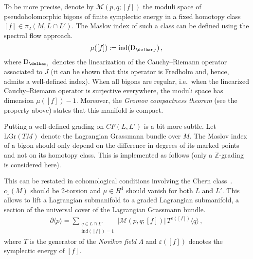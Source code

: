     To be more precise, denote by $\mathcal{M}(p,q;[f])$ the moduli space of pseudoholomorphic bigons of finite symplectic energy in a fixed homotopy class $[f]\in\pi_2(M,L\cap L')$. The Maslov index of such a class can be defined using the spectral flow approach.
    \begin{gather}
        \mu([f]) := \mathrm{ind}(\mathrm{D}_{\delbar_J})\,,
    \end{gather}
    where $\mathrm{D}_{\delbar_j}$ denotes the linearization of the Cauchy--Riemann operator associated to $J$ (it can be shown that this operator is Fredholm and, hence, admits a well-defined index). When all bigons are regular, i.e.~when the linearized Cauchy--Riemann operator is surjective everywhere, the moduli space has dimension $\mu([f])-1$. Moreover, the \textit{Gromov compactness theorem} (see the property above) states that this manifold is compact.

    Putting a well-defined grading on $CF(L,L')$ is a bit more subtle. Let $\mathrm{LGr}(TM)$ denote the Lagrangian Grassmann bundle over $M$. The Maslov index of a bigon should only depend on the difference in degrees of its marked points and not on its homotopy class. This is implemented as follows (only a $\mathbb{Z}$-grading is considered here).

    This can be restated in cohomological conditions involving the Chern class~\citep{moshayedi_4-manifold_2021}. $c_1(M)$ should be 2-torsion and $\mu\in H^1$ should vanish for both $L$ and $L'$. This allows to lift a Lagrangian submanifold to a graded Lagrangian submanifold, a section of the universal cover of the Lagrangian Grassmann bundle.
    \begin{gather}
        \partial\langle p \rangle = \sum_{\substack{q\in L\cap L'\\\mathrm{ind}([f])=1}}\bigl|\mathcal{M}(p,q;[f])\bigr|\,T^{\varepsilon([f])}\langle q \rangle\,,
    \end{gather}
    where $T$ is the generator of the \textit{Novikov field} $\Lambda$ and $\varepsilon([f])$ denotes the symplectic energy of $[f]$.

